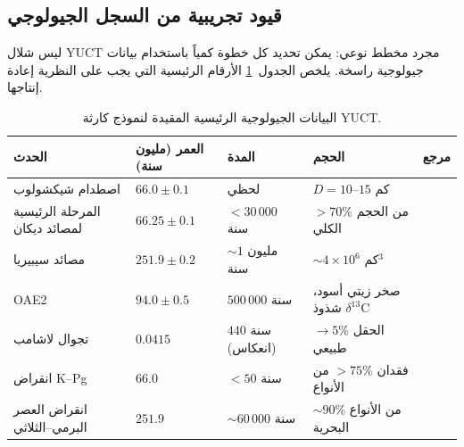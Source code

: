 \documentclass[11pt,a4paper]{article}
\begin{document}
	\subsection{قيود تجريبية من السجل الجيولوجي}
	ليس شلال YUCT مجرد مخطط نوعي: يمكن تحديد كل خطوة كمياً باستخدام بيانات جيولوجية راسخة. يلخص الجدول~\ref{tab:geodata} الأرقام الرئيسية التي يجب على النظرية إعادة إنتاجها.
	
	\begin{table}[H]
		\centering
		\small
		\caption{البيانات الجيولوجية الرئيسية المقيدة لنموذج كارثة YUCT.}
		\label{tab:geodata}
		\begin{tabular}{@{}p{4.2cm} p{2.6cm} p{2.8cm} p{4.2cm} p{1.2cm}@{}}
			\toprule
			\textbf{الحدث} & \textbf{العمر (مليون سنة)} & \textbf{المدة} & \textbf{الحجم} & \textbf{مرجع} \\
			\midrule
			اصطدام شيكشولوب & \(66.0 \pm 0.1\) & لحظي & \(D = 10\)–\(15\) كم & \cite{Schulte2010} \\
			المرحلة الرئيسية لمصائد ديكان & \(66.25 \pm 0.1\) & \(<30\,000\) سنة & \(>70\%\) من الحجم الكلي & \cite{Schoene2019} \\
			مصائد سيبيريا & \(251.9 \pm 0.2\) & \(\sim 1\) مليون سنة & \(\sim 4\times10^6\) كم\(^3\) & \cite{SiberianTraps} \\
			OAE2 & \(94.0 \pm 0.5\) & \(500\,000\) سنة & صخر زيتي أسود، شذوذ \(\delta^{13}\)C & \cite{Jenkyns2010} \\
			تجوال لاشامب & \(0.0415\) & \(440\) سنة (انعكاس) & الحقل \(\to 5\%\) طبيعي & \cite{Laschamp} \\
			انقراض K–Pg & \(66.0\) & \(<50\) سنة & فقدان \(>75\%\) من الأنواع & \cite{Schulte2010} \\
			انقراض العصر البرمي–الثلاثي & \(251.9\) & \(\sim 60\,000\) سنة & \(\sim 90\%\) من الأنواع البحرية & \cite{Burgess2014} \\
			\bottomrule
		\end{tabular}
	\end{table}
	
\end{document}
